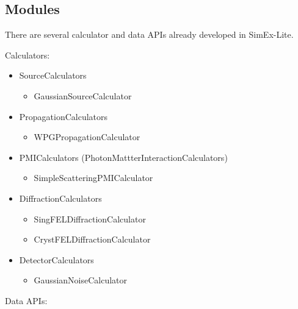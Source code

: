 \documentclass[11pt, a4paper]{article}
\begin{document}
\subsection{Modules}
There are several calculator and data APIs already developed in SimEx-Lite. 

Calculators:
\begin{itemize}
    \item SourceCalculators
    \begin{itemize}
        \item GaussianSourceCalculator \cite{samoylova2016}
    \end{itemize}
    \item PropagationCalculators
    \begin{itemize}
        \item WPGPropagationCalculator \cite{samoylova2016}
    \end{itemize}
    \item PMICalculators (PhotonMattterInteractionCalculators)
    \begin{itemize}
        \item SimpleScatteringPMICalculator
    \end{itemize}
    \item DiffractionCalculators
    \begin{itemize}
        \item SingFELDiffractionCalculator \cite{pysingfel}
        \item CrystFELDiffractionCalculator \cite{white2012jac}
    \end{itemize}
    \item DetectorCalculators
    \begin{itemize}
        \item GaussianNoiseCalculator \cite{e2022}
    \end{itemize}
\end{itemize}

Data APIs:
\end{document}
